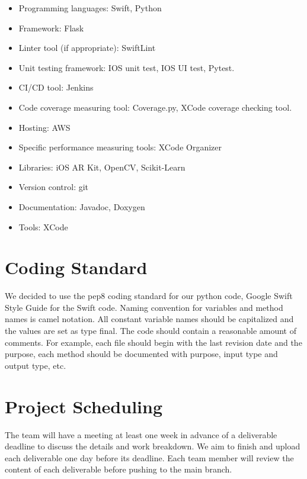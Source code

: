 \documentclass{article}
\begin{document}
\begin{itemize}
\item Programming languages: Swift, Python
\item Framework: Flask
\item Linter tool (if appropriate): SwiftLint
\item Unit testing framework: IOS unit test, IOS UI test, Pytest.
\item CI/CD tool: Jenkins
\item Code coverage measuring tool: Coverage.py, XCode coverage checking tool.
\item Hosting: AWS
\item Specific performance measuring tools: XCode Organizer
\item Libraries: iOS AR Kit, OpenCV, Scikit-Learn
\item Version control: git
\item Documentation: Javadoc, Doxygen
\item Tools: XCode
\end{itemize}

\section{Coding Standard}

We decided to use the pep8 coding standard for our python code, Google Swift Style Guide for the Swift code. Naming convention for variables and method names is camel notation. All constant variable names should be capitalized and the values are set as type final. The code should contain a reasonable amount of comments. For example, each file should begin with the last revision date and the purpose, each method should be documented with purpose, input type and output type, etc.

\section{Project Scheduling}

The team will have a meeting at least one week in advance of a deliverable deadline to discuss the details and work breakdown. We aim to finish and upload each deliverable one day before its deadline. Each team member will review the content of each deliverable before pushing to the main branch.
\end{document}
